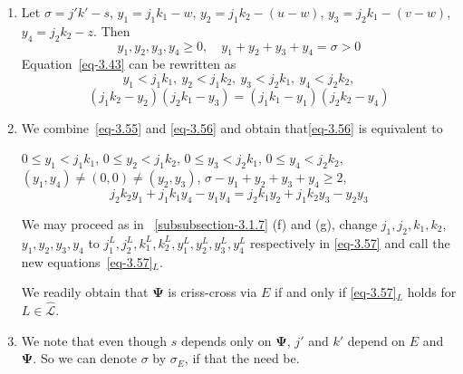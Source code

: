 \documentclass[a4paper,12pt]{article}
\theoremstyle{definition}
\theoremstyle{underlinethm}
\theoremstyle{definition}
\begin{document}
\begin{enumerate}[label =(\alph*)]

\item Let $\sigma = j' k'-s$, $y_{1} = j_{1}k_{1}-w$, $y_{2}= j_{1}k_{2}-(u-w)$, $y_{3} = j_{2}k_{1}-(v-w)$, $y_{4} = j_{2} k_{2}-z$. Then 
\begin{equation}
y_{1}, y_{2}, y_{3}, y_{4} \geq 0,\quad y_{1} + y_{2} + y_{3} + y_{4} = \sigma > 0\tag{3.55}\label{eq-3.55}
\end{equation}
Equation~\eqref{eq-3.43} can be rewritten as
$$
y_{1} < j_{1} k_{1},~ y_{2} < j_{1}k_{2},~ y_{3} < j_{2}k_{1},~ y_{4} < j_{2}k_{2},
$$
\begin{equation}
(j_{1}k_{2} -y_{2})(j_{2} k_{1} - y_{3}) = (j_{1}k_{1}-y_{1})(j_{2}k_{2}-y_{4})\tag{3.56}\label{eq-3.56}
\end{equation}

\item We combine~\eqref{eq-3.55} and \eqref{eq-3.56} and obtain that\eqref{eq-3.56} is equivalent to 

$0 \leq y_{1} < j_{1} k_{1}$, $0 \leq y_{2} < j_{1} k_{2}$, $0 \leq y_{3} < j_{2} k_{1}$, $ 0 \leq y_{4} < j_{2} k_{2}$, $\left(y_{1}, y_{4}\right) \neq (0,0) \neq \left(y_{2}, y_{3}\right)$, $\sigma - y_{1} + y_{2} + y_{3} + y_{4} \geq 2$, 
\begin{equation}
j_{2}k_{2}y_{1} + j_{1} k_{1} y_{4} - y_{1}y_{4} = j_{2} k_{1} y_{2} + j_{1} k_{2} y_{3} - y_{2}y_{3}\tag{3.57}\label{eq-3.57}
\end{equation}

We may proceed as in ~\eqref{subsubsection-3.1.7} (f) and (g), change $j_{1}, j_{2}, k_{1}, k_{2}$, $y_{1}, y_{2}, y_{3}, y_{4}$ to $j_{1}^{L}, j_{2}^{L}, k_{1}^{L}, k_{2}^{L}, y_{1}^{L}, y_{2}^{L}, y_{3}^{L}, y_{4}^{L}$ respectively in \eqref{eq-3.57} and call the new equations~\eqref{eq-3.57}$_{L}$.

We readily obtain that $\boldsymbol{\Psi}$ is criss-cross via $E$ if and only if \eqref{eq-3.57}$_{L}$ holds for $L \in \hat{\mathcal{L}}$.

\item We note that even though $s$ depends only on $\boldsymbol{\Psi}$, $j'$ and $k'$ depend on $E$ and $\boldsymbol{\Psi}$. So we can denote $\sigma$ by $\sigma_{E}$, if that the need be.


\end{enumerate}
\end{document}
